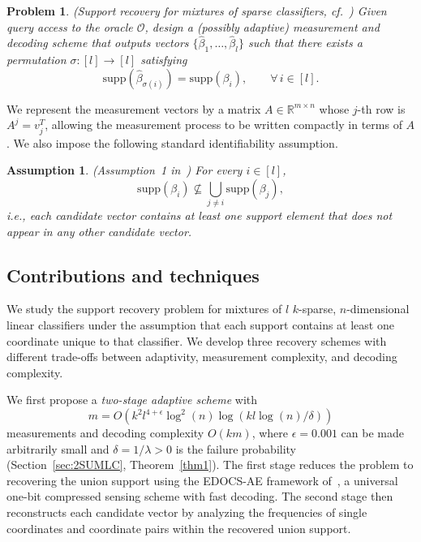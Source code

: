 \documentclass[10pt,a4paper]{amsart}
\newtheorem{problem}{Problem}[section]
\newtheorem{assumption}{Assumption}[section]
\newcommand{\supp}{\mathrm{supp}}
\begin{document}
\begin{problem}\label{Problem1}
(Support recovery for mixtures of sparse classifiers, cf.~\cite{gandikota2020recovery})
Given query access to the oracle $\mathcal{O}$, design a (possibly adaptive) measurement and decoding scheme that outputs vectors $\{\hat{\beta}_1,\dots,\hat{\beta}_l\}$ such that there exists a permutation $\sigma:[l]\to[l]$ satisfying
\[
\supp(\hat{\beta}_{\sigma(i)})=\supp(\beta_i),
\qquad \forall\, i\in[l].
\]
\end{problem}

We represent the measurement vectors by a matrix $A\in\mathbb{R}^{m\times n}$ whose $j$-th row is $A^j=v_j^T$, allowing the measurement process to be written compactly in terms of $A$. We also impose the following standard identifiability assumption.

\begin{assumption}\label{Assumption1}
(Assumption~1 in~\cite{gandikota2020recovery})
For every $i\in[l]$,
\[
\supp(\beta_i)\nsubseteq\bigcup_{j\neq i}\supp(\beta_j),
\]
i.e., each candidate vector contains at least one support element that does not appear in any other candidate vector.
\end{assumption}

\subsection{Contributions and techniques}

We study the support recovery problem for mixtures of $l$ $k$-sparse, $n$-dimensional linear classifiers under the assumption that each support contains at least one coordinate unique to that classifier. We develop three recovery schemes with different trade-offs between adaptivity, measurement complexity, and decoding complexity.

We first propose a {\em two-stage adaptive scheme} with
\[
m=O\!\left(k^2l^{4+\epsilon}\log^2(n)\log(kl\log(n)/\delta)\right)
\]
measurements and decoding complexity $O(km)$, where $\epsilon=0.001$ can be made arbitrarily small and $\delta=1/\lambda>0$ is the failure probability (Section~\ref{sec:2SUMLC}, Theorem~\ref{thm1}). The first stage reduces the problem to recovering the union support using the EDOCS-AE framework of~\cite{li2025support}, a universal one-bit compressed sensing scheme with fast decoding. The second stage then reconstructs each candidate vector by analyzing the frequencies of single coordinates and coordinate pairs within the recovered union support.
\end{document}
